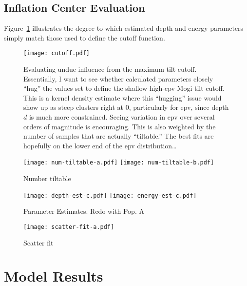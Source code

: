 \subsection{Inflation Center Evaluation}

Figure~\ref{fig:cutoff} illustrates the degree to which estimated depth and energy parameters simply match those used to define the cutoff function.

\begin{figure}
    \texttt{[image: cutoff.pdf]}%
    \caption[Cutoff Effect]{Evaluating undue influence from the maximum tilt cutoff. Essentially, I want to see whether calculated parameters closely ``hug'' the values set to define the shallow high-\acs{epv} Mogi tilt cutoff. This is a kernel density estimate where this ``hugging'' issue would show up as steep clusters right at 0, particularly for \acs{epv}, since depth $d$ is much more constrained. Seeing variation in \acs{epv} over several orders of magnitude is encouraging. This is also weighted by the number of samples that are actually ``tiltable.'' The best fits are hopefully on the lower end of the \acs{epv} distribution\dots} 
    \label{fig:cutoff}
\end{figure}

\begin{figure}
    \texttt{[image: num-tiltable-a.pdf]}%
    \texttt{[image: num-tiltable-b.pdf]}%
    \caption[Inflation Center Candidates by number of ``Tiltable'' Samples]{Number tiltable} 
    \label{fig:num-tiltable}
\end{figure}

\begin{figure}
    \texttt{[image: depth-est-c.pdf]}%
    \texttt{[image: energy-est-c.pdf]}%
    \caption[Inflation Center Candidates by Parameter Estimates]{Parameter Estimates. Redo with Pop. A} 
    \label{fig:param-est}
\end{figure}

\begin{figure}
    \texttt{[image: scatter-fit-a.pdf]}%
    \caption[Scatter Fit]{Scatter fit} 
    \label{fig:scatter-fit-a}
\end{figure}


\section{Model Results}
